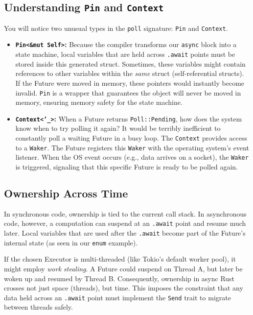 \subsection{Understanding \texttt{Pin} and \texttt{Context}}

You will notice two unusual types in the \texttt{poll} signature: \texttt{Pin} and \texttt{Context}.

\begin{itemize}
    \item \textbf{\texttt{Pin<\&mut Self>}:} Because the compiler transforms our \texttt{async} block into a state machine, local variables that are held across \texttt{.await} points must be stored inside this generated struct. Sometimes, these variables might contain references to other variables within the \textit{same} struct (self-referential structs). If the Future were moved in memory, these pointers would instantly become invalid. \texttt{Pin} is a wrapper that guarantees the object will never be moved in memory, ensuring memory safety for the state machine.
    \item \textbf{\texttt{Context<'\_>}:} When a Future returns \texttt{Poll::Pending}, how does the system know when to try polling it again? It would be terribly inefficient to constantly poll a waiting Future in a busy loop. The \texttt{Context} provides access to a \texttt{Waker}. The Future registers this \texttt{Waker} with the operating system's event listener. When the OS event occurs (e.g., data arrives on a socket), the \texttt{Waker} is triggered, signaling that this specific Future is ready to be polled again.
\end{itemize}

\subsection{Ownership Across Time}

In synchronous code, ownership is tied to the current call stack. In asynchronous code, however, a computation can suspend at an \texttt{.await} point and resume much later. Local variables that are used after the \texttt{.await} become part of the Future's internal state (as seen in our \texttt{enum} example).

If the chosen Executor is multi-threaded (like Tokio's default worker pool), it might employ \textit{work stealing}. A Future could suspend on Thread A, but later be woken up and resumed by Thread B. Consequently, ownership in async Rust crosses not just space (threads), but time. This imposes the constraint that any data held across an \texttt{.await} point must implement the \texttt{Send} trait to migrate between threads safely.

